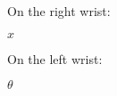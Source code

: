 \documentclass{article}
\begin{document}

%
On the right wrist:

\vspace{2em}
{
\fontsize{72pt}{72pt}
$x$
}

\vspace{10em}
On the left wrist:

\vspace{2em}
{
\fontsize{72pt}{72pt}
$\theta$
}

%
\end{document}
